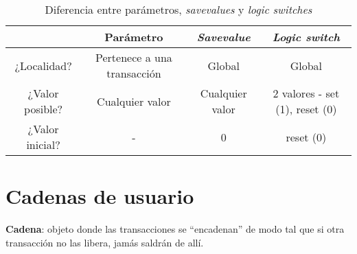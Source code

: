 \documentclass[12pt,a4paper, twoside]{paquetes-apunte/apunte}
\providecommand{\tabularnewline}{\\}
\begin{document}
\begin{table}[H]
\noindent \begin{centering}
\begin{tabular}{|c|c|c|c|}
\hline 
 & \textbf{Parámetro} & \textbf{\emph{Savevalue}} & \textbf{\emph{Logic switch}}\tabularnewline
\hline 
\hline 
¿Localidad? & Pertenece a una transacción & Global & Global\tabularnewline
\hline 
¿Valor posible? & Cualquier valor & Cualquier valor & 2 valores - set (1), reset (0)\tabularnewline
\hline 
¿Valor inicial? & - & 0 & reset (0)\tabularnewline
\hline 
\end{tabular}
\par\end{centering}

\caption{Diferencia entre parámetros, \emph{savevalues} y \emph{logic switches}}


\end{table}



\section{Cadenas de usuario}

\textbf{Cadena}: objeto donde las transacciones se ``encadenan''
de modo tal que si otra transacción no las libera, jamás saldrán de
allí.
\end{document}
